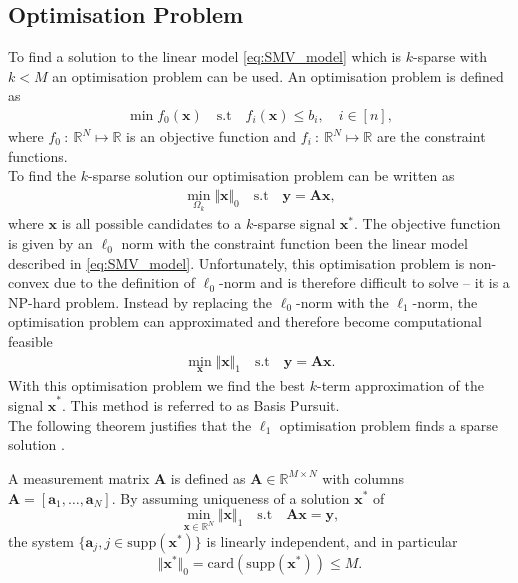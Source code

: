\subsection{Optimisation Problem}\label{sec:opti}
To find a solution to the linear model \eqref{eq:SMV_model} which is $k$-sparse with $k < M$ an optimisation problem can be used. An optimisation problem is defined as
\begin{align*}
\min f_0 (\mathbf{x}) \quad \text{s.t} \quad f_i (\mathbf{x}) \leq b_i, \quad i \in [n],
\end{align*}
where $f_0 \ : \ \mathbb{R}^N \mapsto \mathbb{R}$ is an objective function and $f_i \ : \ \mathbb{R}^N \mapsto \mathbb{R}$ are the constraint functions. 
\\
To find the $k$-sparse solution our optimisation problem can be written as
\begin{align*}
\min_{\Omega_k} \Vert \mathbf{x} \Vert_0 \quad \text{s.t} \quad \mathbf{y} = \mathbf{Ax},
\end{align*}
where $\mathbf{x}$ is all possible candidates to a $k$-sparse signal $\mathbf{x}^\ast$. The objective function is given by an $\ell_0$ norm with the constraint function been the linear model described in \eqref{eq:SMV_model}. Unfortunately, this optimisation problem is non-convex due to the definition of $\ell_0$-norm and is therefore difficult to solve -- it is a NP-hard problem. Instead by replacing the $\ell_0$-norm with the $\ell_1$-norm, the optimisation problem can approximated and therefore become computational feasible \cite[p. 27]{CS}
\begin{align}\label{eq:SMV_p1}
\min_{\mathbf{x}} \Vert \mathbf{x} \Vert_1 \quad \text{s.t} \quad \mathbf{y} = \mathbf{Ax}.
\end{align} 
With this optimisation problem we find the best $k$-term approximation of the signal $\hat{\mathbf{x}}^\ast$. This method is referred to as Basis Pursuit. 
\\
The following theorem justifies that the $\ell_1$ optimisation problem finds a sparse solution \cite[p. 62-63]{FR}.
\begin{theorem}
A measurement matrix $\mathbf{A}$ is defined as $\textbf{A} \in \mathbb{R}^{M \times N}$ with columns $\textbf{A} = [\textbf{a}_1, \dots, \textbf{a}_N]$. By assuming uniqueness of a solution $\textbf{x}^{\ast}$ of
$$
\min_{\textbf{x} \in \mathbb{R}^N} \Vert \textbf{x} \Vert_1 \quad \text{s.t} \quad \textbf{Ax} = \textbf{y},
$$
the system $\{ \textbf{a}_j, j \in \text{supp} ( \textbf{x}^{\ast})\}$ is linearly independent, and in particular
$$
\Vert \textbf{x}^{\ast} \Vert_0 = \text{card}(\text{supp} (\textbf{x}^{\ast})) \leq M.
$$
\end{theorem}
